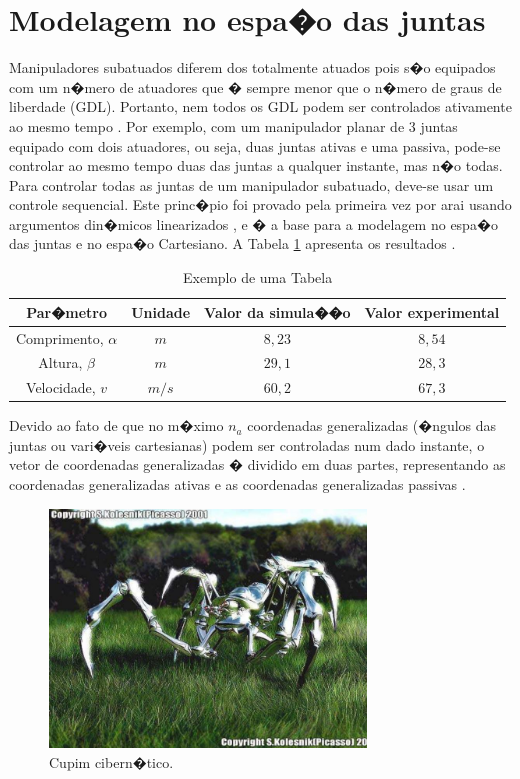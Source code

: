 \section{Modelagem no espa�o das juntas}
Manipuladores subatuados diferem dos totalmente atuados pois s�o equipados com um n�mero de atuadores que � sempre menor que o n�mero de graus de liberdade (GDL). Portanto, nem todos os GDL podem ser controlados ativamente ao mesmo tempo \cite{Sbornian2004}. Por exemplo, com um manipulador planar de 3 juntas equipado com dois atuadores, ou seja, duas juntas ativas e
uma passiva, pode-se controlar ao mesmo tempo duas das juntas a qualquer instante, mas n�o todas. Para controlar todas as juntas de um manipulador subatuado, deve-se usar um controle sequencial. Este princ�pio foi provado pela primeira vez por {arai} usando  argumentos din�micos linearizados \cite{Joea2003}, e � a base para a modelagem no espa�o das juntas e no espa�o Cartesiano. A Tabela \ref{minhatab} apresenta os resultados \cite[p. 50]{Assenmacher1993,Silberschatz1991,Caromel1998}.

\begin{table}
\caption{Exemplo de uma Tabela}
\label{minhatab}

\center
\begin{tabular}{cccc}
  \hline
	Par�metro & Unidade & Valor da simula��o & Valor experimental   \\
	\hline
  Comprimento, $\alpha$ & $m$ &  $8,23$  & $8,54$ \\
  Altura, $\beta$ & $m$     &  $29,1$ & $28,3$\\
	Velocidade, $v$ & $m/s$  &  $60,2$ & $67,3$\\
	\hline
\end{tabular}
\end{table}

Devido ao fato de que no m�ximo $n_{a}$ coordenadas generalizadas (�ngulos das juntas ou vari�veis cartesianas) podem ser controladas num dado instante, o vetor de coordenadas generalizadas � dividido em duas partes, representando as coordenadas generalizadas ativas e as coordenadas generalizadas passivas \cite{Callaghan1995}.

\begin{figure}[ht]
\centering
\includegraphics[width=0.75\textwidth]{Cap2/spiderrobot}
\caption{Cupim cibern�tico.}\label{FDIII}
\end{figure}

